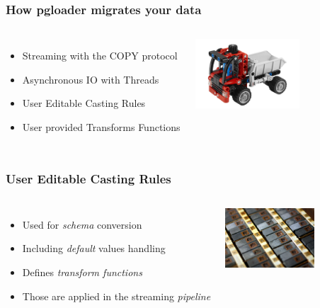 \documentclass{beamer}
\begin{document}
\begin{frame}[fragile]
  \frametitle{How pgloader migrates your data}
  
  \vfill

\begin{columns}

  \begin{itemize}
  \item Streaming with the COPY protocol
  \item Asynchronous IO with Threads
  \item User Editable Casting Rules
  \item User provided Transforms Functions
  \end{itemize}  

\begin{center}
  \includegraphics[height=7em]{toy-loader.jpg}
\end{center}
\end{columns}
\end{frame}

\begin{frame}[fragile]
  \frametitle{User Editable Casting Rules}
  
  \vfill

\begin{columns}
  \begin{itemize}
  \item Used for \textit{schema} conversion
  \item Including \textit{default} values handling
  \item Defines \textit{transform functions}
  \item Those are applied in the streaming \textit{pipeline}
  \end{itemize}
\begin{center}
  \includegraphics[height=6em]{cast.jpg}
\end{center}
\end{columns}
\end{frame}
\end{document}
